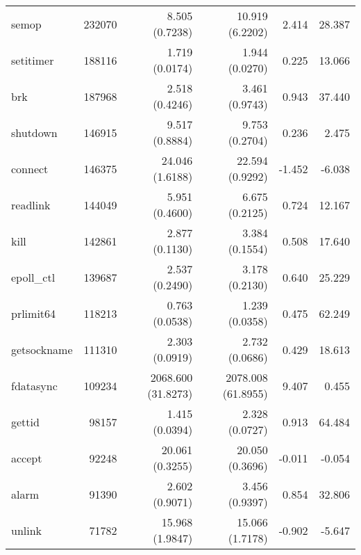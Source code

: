\begin{longtable}{>{\ttfamily}lrrrrr}
                          semop &     232070 &           8.505 (0.7238) &          10.919 (6.2202) &           2.414 &       28.387 \\
                      setitimer &     188116 &           1.719 (0.0174) &           1.944 (0.0270) &           0.225 &       13.066 \\
                            brk &     187968 &           2.518 (0.4246) &           3.461 (0.9743) &           0.943 &       37.440 \\
                       shutdown &     146915 &           9.517 (0.8884) &           9.753 (0.2704) &           0.236 &        2.475 \\
                        connect &     146375 &          24.046 (1.6188) &          22.594 (0.9292) &          -1.452 &       -6.038 \\
                       readlink &     144049 &           5.951 (0.4600) &           6.675 (0.2125) &           0.724 &       12.167 \\
                           kill &     142861 &           2.877 (0.1130) &           3.384 (0.1554) &           0.508 &       17.640 \\
                     epoll\_ctl &     139687 &           2.537 (0.2490) &           3.178 (0.2130) &           0.640 &       25.229 \\
                      prlimit64 &     118213 &           0.763 (0.0538) &           1.239 (0.0358) &           0.475 &       62.249 \\
                    getsockname &     111310 &           2.303 (0.0919) &           2.732 (0.0686) &           0.429 &       18.613 \\
                      fdatasync &     109234 &       2068.600 (31.8273) &       2078.008 (61.8955) &           9.407 &        0.455 \\
                         gettid &      98157 &           1.415 (0.0394) &           2.328 (0.0727) &           0.913 &       64.484 \\
                         accept &      92248 &          20.061 (0.3255) &          20.050 (0.3696) &          -0.011 &       -0.054 \\
                          alarm &      91390 &           2.602 (0.9071) &           3.456 (0.9397) &           0.854 &       32.806 \\
                         unlink &      71782 &          15.968 (1.9847) &          15.066 (1.7178) &          -0.902 &       -5.647 \\

\end{longtable}
